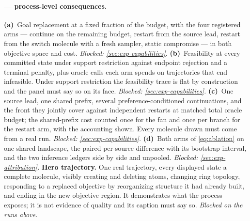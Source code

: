 \paragraph{ --- process-level consequences.}
\textbf{(a)}~Goal replacement at a fixed fraction of the budget, with the four registered arms --- continue on the remaining budget, restart from the source lead, restart from the switch molecule with a fresh sampler, static compromise --- in both objective space and cost. \emph{Blocked: \cref{sec:exp-capabilities}.}
\textbf{(b)}~Feasibility at every committed state under support restriction against endpoint rejection and a terminal penalty, plus oracle calls each arm spends on trajectories that end infeasible. Under support restriction the feasibility trace is flat by construction and the panel must say so on its face. \emph{Blocked: \cref{sec:exp-capabilities}.}
\textbf{(c)}~One source lead, one shared prefix, several preference-conditioned continuations, and the front they jointly cover against independent restarts at matched total oracle budget; the shared-prefix cost counted once for the fan and once per branch for the restart arm, with the accounting shown. Every molecule drawn must come from a real run. \emph{Blocked: \cref{sec:exp-capabilities}.}
\textbf{(d)}~Both arms of \eqref{eq:ablation} on one shared landscape, the paired per-source difference with its bootstrap interval, and the two inference ledgers side by side and unpooled. \emph{Blocked: \cref{sec:exp-attribution}.}
\textbf{Hero trajectory.} One real trajectory, every displayed state a complete molecule, visibly creating and deleting atoms, changing ring topology, responding to a replaced objective by reorganizing structure it had already built, and ending in the new objective region. It demonstrates what the process exposes; it is not evidence of quality and its caption must say so. \emph{Blocked on the runs above.}

